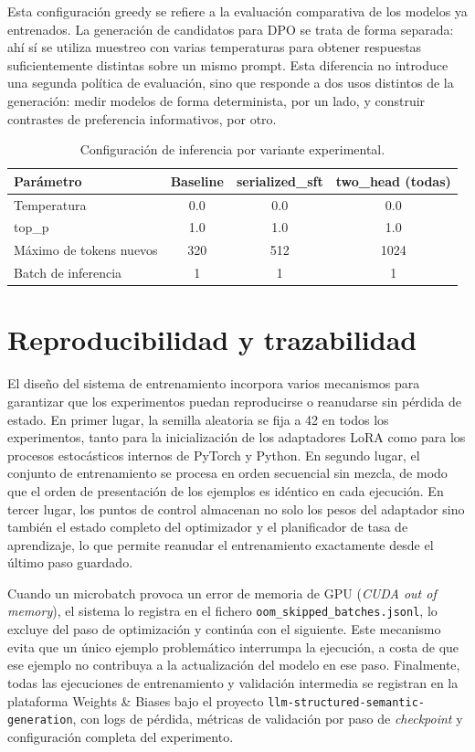 Esta configuración greedy se refiere a la evaluación comparativa de los modelos ya entrenados. La generación de candidatos para DPO se trata de forma separada: ahí sí se utiliza
muestreo con varias temperaturas para obtener respuestas suficientemente distintas sobre un mismo prompt. Esta diferencia no introduce una segunda política de evaluación, sino que
responde a dos usos distintos de la generación: medir modelos de forma determinista, por un lado, y construir contrastes de preferencia informativos, por otro.

\begin{table}[htbp]
\centering
\caption{Configuración de inferencia por variante experimental.}
\label{tab:AnexoA_inference}
\begin{tabular}{lccc}
\toprule
\textbf{Parámetro} & \textbf{Baseline} & \textbf{serialized\_sft} & \textbf{two\_head (todas)} \\
\midrule
Temperatura & 0.0 & 0.0 & 0.0 \\
top\_p & 1.0 & 1.0 & 1.0 \\
Máximo de tokens nuevos & 320 & 512 & 1024 \\
Batch de inferencia & 1 & 1 & 1 \\
\bottomrule
\end{tabular}
\end{table}

\section{Reproducibilidad y trazabilidad}

El diseño del sistema de entrenamiento incorpora varios mecanismos para garantizar que los experimentos puedan reproducirse o reanudarse sin pérdida de estado.
En primer lugar, la semilla aleatoria se fija a 42 en todos los experimentos, tanto para la inicialización de los adaptadores LoRA como para los procesos estocásticos
internos de PyTorch y Python. En segundo lugar, el conjunto de entrenamiento se procesa en orden secuencial sin mezcla, de modo que el orden de presentación de los ejemplos
es idéntico en cada ejecución. En tercer lugar, los puntos de control almacenan no solo los pesos del adaptador sino también el estado completo del optimizador y el planificador
de tasa de aprendizaje, lo que permite reanudar el entrenamiento exactamente desde el último paso guardado.

Cuando un microbatch provoca un error de memoria de GPU (\textit{CUDA out of memory}), el sistema lo registra en el fichero \texttt{oom\_skipped\_batches.jsonl}, lo excluye
del paso de optimización y continúa con el siguiente. Este mecanismo evita que un único ejemplo problemático interrumpa la ejecución, a costa de que ese ejemplo no contribuya
a la actualización del modelo en ese paso. Finalmente, todas las ejecuciones de entrenamiento y validación intermedia se registran en la plataforma Weights \& Biases bajo el
proyecto \texttt{llm-structured-semantic-generation}, con logs de pérdida, métricas de validación por paso de \textit{checkpoint} y configuración completa del experimento.

